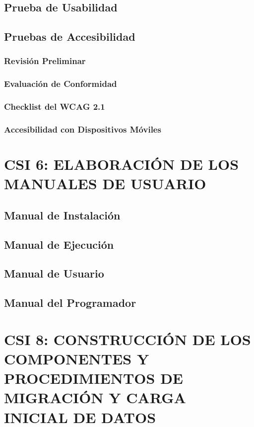 \subsection{Prueba de Usabilidad}

\subsection{Pruebas de Accesibilidad} 
 
\subsubsection{Revisión Preliminar} 

\subsubsection{Evaluación de Conformidad} 

\subsubsection{Checklist del WCAG 2.1} 

\subsubsection{Accesibilidad con Dispositivos Móviles} 


\newpage
\section{CSI 6: ELABORACIÓN DE LOS MANUALES DE USUARIO}

\subsection{Manual de Instalación} 

\subsection{Manual de Ejecución} 

\subsection{Manual de Usuario} 

\subsection{Manual del Programador}


\newpage
\section{CSI 8: CONSTRUCCIÓN DE LOS COMPONENTES Y PROCEDIMIENTOS DE MIGRACIÓN Y CARGA INICIAL DE DATOS}


